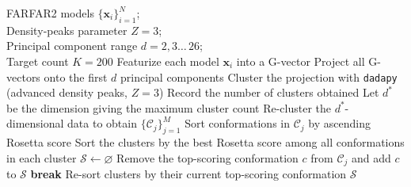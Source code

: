 \documentclass[%
aip,
 amsmath,amssymb,
reprint,%
twocolumn,
]{revtex4-1}
\begin{document}
{\begin{algorithm}[H]
  \caption{Unsupervised selection of diverse candidate conformations}
  \label{alg:candidate-selection}
  \begin{algorithmic}[1]
    \REQUIRE FARFAR2 models $\{\mathbf{x}_i\}_{i=1}^{N}$; \\
    Density‐peaks parameter $Z{=}3$;\\
    Principal component range $d\!=\!2,3\ldots\,26$;\\
    Target count $K{=}200$
    \STATE Featurize each model $\mathbf{x}_i$ into a G-vector
      \STATE Project all G-vectors onto the first $d$ principal components
      \STATE Cluster the projection with \texttt{dadapy} (advanced density peaks, $Z{=}3$)
      \STATE Record the number of clusters obtained
    \ENDFOR
    \STATE Let $d^\ast$ be the dimension giving the maximum cluster count 
    \STATE Re-cluster the $d^\ast$-dimensional data to obtain $\{\mathcal{C}_j\}_{j=1}^{M}$
      \STATE Sort conformations in $\mathcal{C}_j$ by ascending Rosetta score
    \ENDFOR
    \STATE Sort the clusters by the best Rosetta score among all conformations in each cluster
    \STATE $\mathcal{S} \leftarrow \varnothing$ 
          \STATE Remove the top-scoring conformation $c$ from $\mathcal{C}_j$ and add $c$ to $\mathcal{S}$
            \STATE \textbf{break}
          \ENDIF
        \ENDIF
      \ENDFOR
      \STATE Re-sort clusters by their current top-scoring conformation
    \ENDWHILE
    \RETURN $\mathcal{S}$ 
  \end{algorithmic}
\end{algorithm}

}
\end{document}
